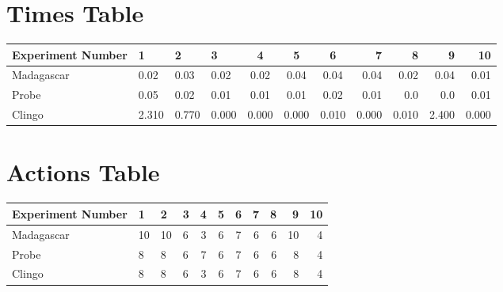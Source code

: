 \documentclass[8pt]{article}
\begin{document}
\begin{landscape}
\section{Times Table}\begin{tabular}{ | l | l | l | l | c | c | c | r | r | r | r | }\hline
Experiment Number & 1 & 2 & 3 & 4 & 5 & 6 & 7 & 8 & 9 & 10\\  \hline
Madagascar & 0.02 & 0.03 & 0.02 & 0.02 & 0.04 & 0.04 & 0.04 & 0.02 & 0.04 & 0.01\\  \hline
Probe & 0.05 & 0.02 & 0.01 & 0.01 & 0.01 & 0.02 & 0.01 & 0.0 & 0.0 & 0.01\\  \hline
Clingo & 2.310 & 0.770 & 0.000 & 0.000 & 0.000 & 0.010 & 0.000 & 0.010 & 2.400 & 0.000\\  \hline
\end{tabular}
\section{Actions Table}\begin{tabular}{ | l | l | l | l | c | c | c | r | r | r | r | }\hline
Experiment Number & 1 & 2 & 3 & 4 & 5 & 6 & 7 & 8 & 9 & 10\\ \hline
 Madagascar & 10 & 10 & 6 & 3 & 6 & 7 & 6 & 6 & 10 & 4\\ \hline
 Probe & 8 & 8 & 6 & 7 & 6 & 7 & 6 & 6 & 8 & 4\\ \hline
 Clingo & 8 & 8 & 6 & 3 & 6 & 7 & 6 & 6 & 8 & 4\\ \hline
\end{tabular}
\end{landscape}
\end{document}
